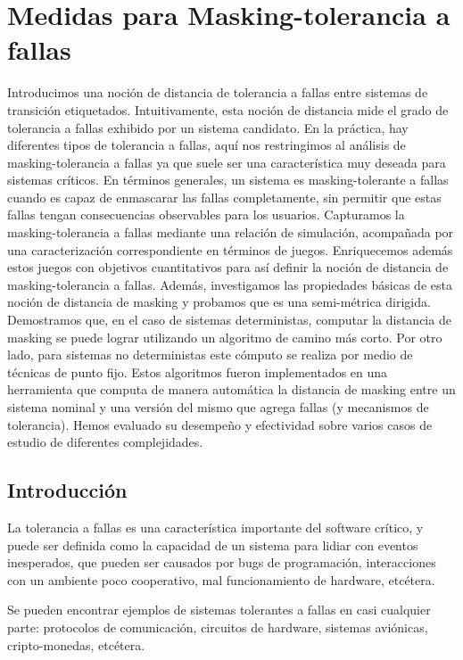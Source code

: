 \chapter{Medidas para Masking-tolerancia a fallas}
\label{cap:maskingMeasure}

Introducimos una noción de distancia de tolerancia a fallas entre sistemas de transición etiquetados. Intuitivamente, esta noción de distancia mide el grado de tolerancia a fallas exhibido por un sistema candidato.
En la práctica, hay diferentes tipos de tolerancia a fallas, aquí nos restringimos al análisis de masking-tolerancia a fallas ya que suele ser una característica muy deseada para sistemas críticos.
En términos generales, un sistema es masking-tolerante a fallas cuando es capaz de enmascarar las fallas completamente, sin permitir que estas fallas tengan consecuencias observables para los usuarios.
Capturamos la masking-tolerancia a fallas mediante una relación de simulación, acompañada por una caracterización correspondiente en términos de juegos.
Enriquecemos además estos juegos con objetivos cuantitativos para así definir la noción de distancia de masking-tolerancia a fallas.
Además, investigamos las propiedades básicas de esta noción de distancia de masking y probamos que es una semi-métrica dirigida.
Demostramos que, en el caso de sistemas deterministas, computar la distancia de masking se puede lograr utilizando un algoritmo de camino más corto.
Por otro lado, para sistemas no deterministas este cómputo se realiza por medio de técnicas de punto fijo. %
Estos algoritmos fueron implementados en una herramienta que computa de manera automática la distancia de masking entre un sistema nominal y una versión del mismo que agrega fallas (y mecanismos de tolerancia). Hemos evaluado su desempeño y efectividad sobre varios casos de estudio de diferentes complejidades.

\section{Introducción} \label{sec:intro}

    La tolerancia a fallas es una característica importante del software crítico, y puede ser definida como la capacidad de un sistema para lidiar con eventos inesperados, que pueden ser causados por bugs de programación, interacciones con un ambiente poco cooperativo, mal funcionamiento de hardware, etcétera.

Se pueden encontrar ejemplos de sistemas tolerantes a fallas en casi cualquier parte: protocolos de comunicación, circuitos de hardware, sistemas aviónicas, cripto-monedas, etcétera.

